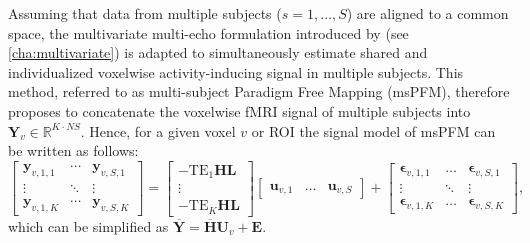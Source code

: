 Assuming that data from multiple subjects ($s=1,\ldots,S$) are aligned to a
common space, the multivariate multi-echo formulation introduced by
\citep{Urunuela2022Wholebrainmultivariate} (see \cref{cha:multivariate}) is
adapted to simultaneously estimate shared and individualized voxelwise
activity-inducing signal in multiple subjects. This method, referred to as
multi-subject Paradigm Free Mapping (msPFM), therefore proposes to concatenate the
voxelwise fMRI signal of multiple subjects into $\mathbf{Y}_v \in \mathbb{R}^{K
\cdot N S}$. Hence, for a given voxel $v$ or ROI the signal model of msPFM can
be written as follows:
\begin{equation}
\label{eq:signal_model_multi_subject}
\left[\begin{array}{ccc} \mathbf{y}_{v,1,1} & \cdots & \mathbf{y}_{v,S,1} \\
    \vdots & \ddots & \vdots \\
    \mathbf{y}_{v,1,K} & \cdots & \mathbf{y}_{v,S,K}
\end{array}\right]
=
\left[\begin{array}{c} -\mathrm{TE}_{1} \mathbf{HL} \\
    \vdots \\
    -\mathrm{TE}_{K} \mathbf{HL}
\end{array}\right]
\left[\begin{array}{ccc}
    \mathbf{u}_{v,1} & \dots & \mathbf{u}_{v,S}
\end{array}\right]
+
\left[\begin{array}{ccc} \boldsymbol{\epsilon}_{v,1,1} & \dots & \boldsymbol{\epsilon}_{v,S,1} \\
    \vdots & \ddots & \vdots \\
    \boldsymbol{\epsilon}_{v,1,K} & \dots & \boldsymbol{\epsilon}_{v,S,K}
\end{array}\right],
\end{equation}
which can be simplified as
$\overline{\mathbf{Y}}=\overline{\mathbf{H}}\mathbf{U}_v + \mathbf{E}$.
